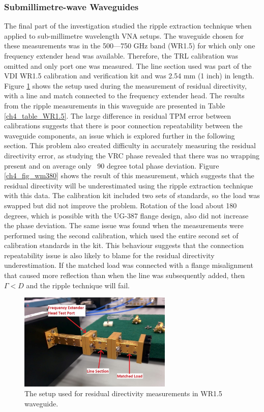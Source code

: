 \documentclass[../thesis/thesis.tex]{subfiles}
\begin{document}
\begin{refsection}
\subsubsection{Submillimetre-wave Waveguides}

The final part of the investigation studied the ripple extraction technique when applied to sub-millimetre wavelength VNA setups. The waveguide chosen for these measurements was in the 500—750 GHz band (WR1.5) for which only one frequency extender head was available. Therefore, the TRL calibration was omitted and only port one was measured. The line section used was part of the VDI WR1.5 calibration and verification kit and was 2.54 mm (1 inch) in length. Figure \ref{ch4_fig_setup} shows the setup used during the measurement of residual directivity, with a line and match connected to the frequency extender head. The results from the ripple measurements in this waveguide are presented in Table \ref{ch4_table_WR1.5}. The large difference in residual TPM error between calibrations suggests that there is poor connection repeatability between the waveguide components, an issue which is explored further in the following section. This problem also created difficulty in accurately measuring the residual directivity error, as studying the VRC phase revealed that there was no wrapping present and on average only ~90 degree total phase deviation. Figure \ref{ch4_fig_wm380} shows the result of this measurement, which suggests that the residual directivity will be underestimated using the ripple extraction technique with this data. The calibration kit included two sets of standards, so the load was swapped but did not improve the problem. Rotation of the load about 180 degrees, which is possible with the UG-387 flange design, also did not increase the phase deviation. The same issue was found when the measurements were performed using the second calibration, which used the entire second set of calibration standards in the kit. This behaviour suggests that the connection repeatability issue is also likely to blame for the residual directivity underestimation. If the matched load was connected with a flange misalignment that caused more reflection than when the line was subsequently added, then $\Gamma < D$ and the ripple technique will fail.

\begin{figure}
	\centering
	\includegraphics[width=0.65\textwidth]{setup.jpg}
	\caption{The setup used for residual directivity measurements in WR1.5 waveguide.}
	\label{ch4_fig_setup}
\end{figure}


\end{refsection}
\end{document}
